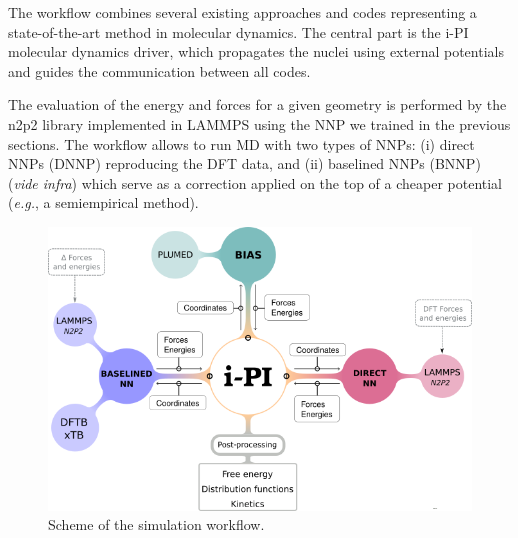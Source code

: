 \documentclass[12pt]{article}
\begin{document}
The workflow combines several existing approaches and codes representing a state-of-the-art method in molecular dynamics. The central part is the i-PI molecular dynamics driver, which propagates the nuclei using external potentials and guides the communication between all codes. 

The evaluation of the energy and forces for a given geometry is performed by the n2p2 library implemented in LAMMPS using the NNP we trained in the previous sections. The workflow allows to run MD with two types of NNPs: (i) direct NNPs (DNNP) reproducing the DFT data, and (ii) baselined NNPs (BNNP) (\textit{vide infra}) which serve as a correction applied on the top of a cheaper potential (\textit{e.g.}, a semiempirical method). 

\begin{figure}[!htp]
    \centering
    \includegraphics[scale=0.8]{latex_files/diagram_general.png}
    \caption{Scheme of the simulation workflow.}
    \label{fig:workflow}
\end{figure}
\end{document}
